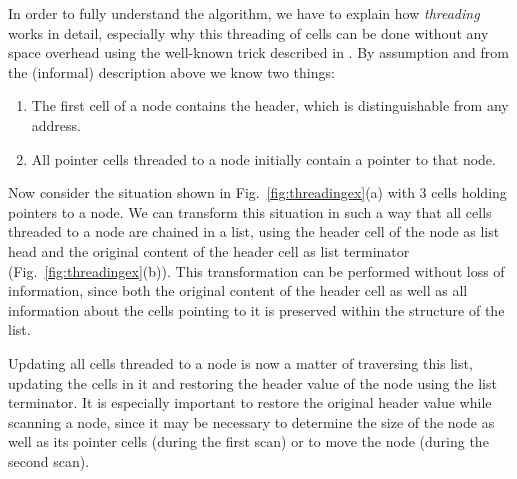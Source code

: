 \documentclass[10pt,a4paper,final,twocolumn]{article}
\begin{document}
In order to fully understand the algorithm, we have to explain how \emph{threading} works
in detail, especially why this threading of cells can be done without any space overhead
using the well-known trick described in \cite{Fisher74}. By assumption and from the (informal)
description above we know two things:
\begin{enumerate}
\item The first cell of a node contains the header, which is distinguishable from any address.
\item All pointer cells threaded to a node initially contain a pointer to that node.
\end{enumerate}
Now consider the situation shown in Fig.~\ref{fig:threadingex}(a) with 3 cells holding pointers
to a node. We can transform this situation in such a way that all cells threaded to a node
are chained in a list, using the header cell of the node as list head and the original content
of the header cell as list terminator (Fig.~\ref{fig:threadingex}(b)). This transformation can
be performed without loss of information, since both the original content of the header cell
as well as all information about the cells pointing to it is preserved within the structure of
the list.

Updating all cells threaded to a node is now a matter of traversing this list, updating the 
cells in it and restoring the header value of the node using the list terminator. It is
especially important to restore the original header value while scanning a node, since it
may be necessary to determine the size of the node as well as its pointer cells (during the
first scan) or to move the node (during the second scan).
\end{document}

